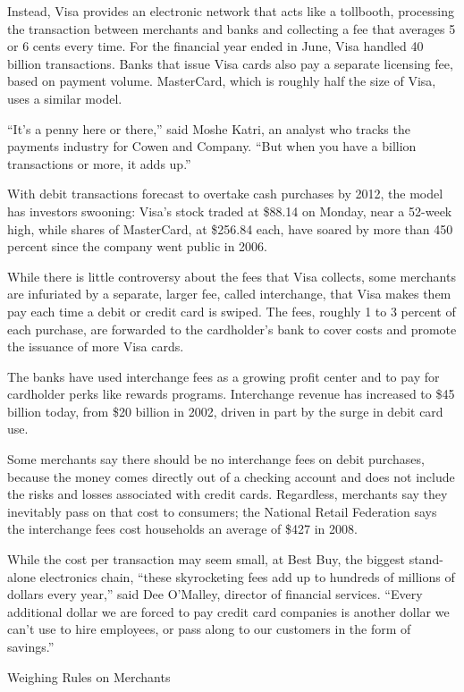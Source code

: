 ﻿\documentclass[12pt]{article}
\begin{document}
Instead, Visa provides an electronic network that acts like a tollbooth, processing the transaction
between merchants and banks and collecting a fee that averages 5 or 6 cents every time. For the
financial year ended in June, Visa handled 40 billion transactions. Banks that issue Visa cards also
pay a separate licensing fee, based on payment volume. MasterCard, which is roughly half the size of
Visa, uses a similar model.

``It's a penny here or there,'' said Moshe Katri, an analyst who tracks the payments industry for
Cowen and Company. ``But when you have a billion transactions or more, it adds up.''

With debit transactions forecast to overtake cash purchases by 2012, the model has investors
swooning: Visa's stock traded at \$88.14 on Monday, near a 52-week high, while shares of MasterCard,
at \$256.84 each, have soared by more than 450 percent since the company went public in 2006.

While there is little controversy about the fees that Visa collects, some merchants are infuriated
by a separate, larger fee, called interchange, that Visa makes them pay each time a debit or credit
card is swiped. The fees, roughly 1 to 3 percent of each purchase, are forwarded to the cardholder's
bank to cover costs and promote the issuance of more Visa cards.

The banks have used interchange fees as a growing profit center and to pay for cardholder perks like
rewards programs. Interchange revenue has increased to \$45 billion today, from \$20 billion in
2002, driven in part by the surge in debit card use.

Some merchants say there should be no interchange fees on debit purchases, because the money comes
directly out of a checking account and does not include the risks and losses associated with credit
cards. Regardless, merchants say they inevitably pass on that cost to consumers; the National Retail
Federation says the interchange fees cost households an average of \$427 in 2008.

While the cost per transaction may seem small, at Best Buy, the biggest stand-alone electronics
chain, ``these skyrocketing fees add up to hundreds of millions of dollars every year,'' said Dee
O'Malley, director of financial services. ``Every additional dollar we are forced to pay credit card
companies is another dollar we can't use to hire employees, or pass along to our customers in the
form of savings.''

Weighing Rules on Merchants
\end{document}
